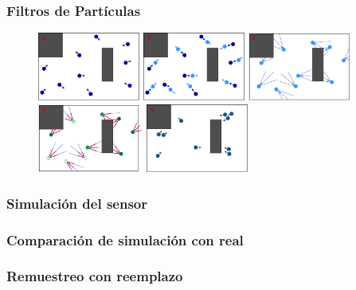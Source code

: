 \begin{frame}\frametitle{Filtros de Partículas}
  \begin{figure}
    \centering
    \includegraphics[width=0.30\textwidth]{Figures/ParticleFilter1.pdf}
    \includegraphics[width=0.30\textwidth]{Figures/ParticleFilter2.pdf}
    \includegraphics[width=0.30\textwidth]{Figures/ParticleFilter3.pdf}
    \includegraphics[width=0.31\textwidth]{Figures/ParticleFilter4.pdf}
    \includegraphics[width=0.30\textwidth]{Figures/ParticleFilter5.pdf}
  \end{figure}
\end{frame}

\begin{frame}\frametitle{Simulación del sensor}
\end{frame}

\begin{frame}\frametitle{Comparación de simulación con real}
\end{frame}

\begin{frame}\frametitle{Remuestreo con reemplazo}
\end{frame}


